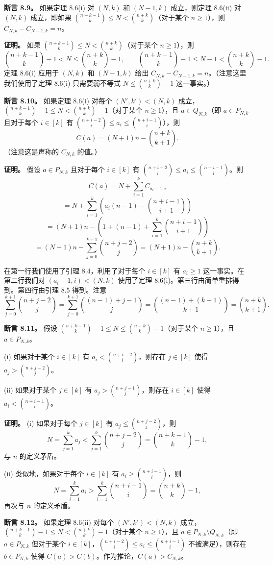 \documentclass[12pt,a4paper]{ctexart}
\theoremstyle{remark}
\begin{document}
\textbf{断言 8.9。} 如果定理 8.6(i) 对 $(N,k)$ 和 $(N-1,k)$ 成立，则定理 8.6(ii) 对 $(N,k)$ 成立，即如果 $\binom{n+k-1}{k}\leq N<\binom{n+k}{k}$（对于某个 $n\geq 1$），则 $C_{N,k}-C_{N-1,k}=n$。

\textbf{证明。} 如果 $\binom{n+k-1}{k}\leq N<\binom{n+k}{k}$（对于某个 $n\geq 1$），则
$$\binom{n+k-1}{k}-1 < N\leq\binom{n+k}{k}-1, \qquad \binom{n+k-1}{k}-1\leq N-1<\binom{n+k}{k}-1.$$
定理 8.6(i) 应用于 $(N,k)$ 和 $(N-1,k)$ 给出 $C_{N,k}-C_{N-1,k}=n$。（注意这里我们使用了定理 8.6(i) 只需要弱不等式 $N\leq\binom{n+k}{k}-1$ 这一事实。）

\textbf{断言 8.10。} 如果定理 8.6(i) 对每个 $(N',k')<(N,k)$ 成立，$\binom{n+k-1}{k}-1\leq N<\binom{n+k}{k}-1$（对于某个 $n\geq 1$），且 $a\in Q_{N,k}$（即 $a\in P_{N,k}$ 且对于每个 $i\in[k]$ 有 $\binom{n+i-2}{i}\leq a_i\leq\binom{n+i-1}{i}$），则
$$C(a)=(N+1)n-\binom{n+k}{k+1}.$$
（注意这是声称的 $C_{N,k}$ 的值。）

\textbf{证明。} 假设 $a\in P_{N,k}$ 且对于每个 $i\in[k]$ 有 $\binom{n+i-2}{i}\leq a_i\leq\binom{n+i-1}{i}$。则
$$C(a) = N + \sum_{i=1}^{k} C_{a_i-1,i}$$
$$= N + \sum_{i=1}^{k}\left(a_i(n-1)-\binom{n+i-1}{i+1}\right)$$
$$= (N+1)n - \left(1+(n-1)+\sum_{i=1}^{k}\binom{n+i-1}{i+1}\right)$$
$$= (N+1)n - \sum_{j=0}^{k+1}\binom{n+j-2}{j} = (N+1)n - \binom{n+k}{k+1}.$$

在第一行我们使用了引理 8.4，利用了对于每个 $i\in[k]$ 有 $a_i\geq 1$ 这一事实。在第二行我们对 $(a_i-1,i)<(N,k)$ 使用了定理 8.6(i)。第三行由简单重排得到。第四行由引理 8.5 得到。注意
$$\sum_{j=0}^{k+1}\binom{n+j-2}{j} = \sum_{j=0}^{k+1}\binom{(n-1)+j-1}{j} = \binom{(n-1)+(k+1)}{k+1} = \binom{n+k}{k+1}.$$

\textbf{断言 8.11。} 假设 $\binom{n+k-1}{k}-1\leq N\leq\binom{n+k}{k}-1$（对于某个 $n\geq 1$），且 $a\in P_{N,k}$。

(i) 如果对于某个 $i\in[k]$ 有 $a_i<\binom{n+i-2}{i}$，则存在 $j\in[k]$ 使得 $a_j>\binom{n+j-2}{j}$。

(ii) 如果对于某个 $j\in[k]$ 有 $a_j>\binom{n+j-1}{j}$，则存在 $i\in[k]$ 使得 $a_i<\binom{n+i-1}{i}$。

\textbf{证明。} (i) 如果对于每个 $j\in[k]$ 有 $a_j\leq\binom{n+j-2}{j}$，则
$$N=\sum_{j=1}^{k}a_j < \sum_{j=1}^{k}\binom{n+j-2}{j} = \binom{n+k-1}{k}-1,$$
与 $n$ 的定义矛盾。

(ii) 类似地，如果对于每个 $i\in[k]$ 有 $a_i\geq\binom{n+i-1}{i}$，则
$$N=\sum_{i=1}^{k}a_i > \sum_{i=1}^{k}\binom{n+i-1}{i} = \binom{n+k}{k}-1,$$
再次与 $n$ 的定义矛盾。

\textbf{断言 8.12。} 如果定理 8.6(ii) 对每个 $(N',k')<(N,k)$ 成立，$\binom{n+k-1}{k}-1\leq N<\binom{n+k}{k}-1$（对于某个 $n\geq 1$），且 $a\in P_{N,k}\setminus Q_{N,k}$（即 $a\in P_{N,k}$ 但对于某个 $i\in[k]$，$\binom{n+i-2}{i}\leq a_i\leq\binom{n+i-1}{i}$ 不被满足），则存在 $b\in P_{N,k}$ 使得 $C(a)>C(b)$。作为推论，$C(a)>C_{N,k}$。
\end{document}
